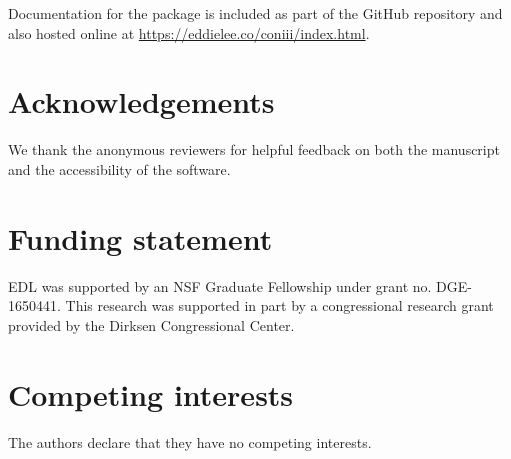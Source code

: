 \documentclass{jors}
\begin{document}
Documentation for the package is included as part of the GitHub repository and also hosted online at \url{https://eddielee.co/coniii/index.html}.

\section*{Acknowledgements}
We thank the anonymous reviewers for helpful feedback on both the manuscript and the accessibility of the software.


\section*{Funding statement}
EDL was supported by an NSF Graduate Fellowship under grant no. DGE-1650441. This research was supported in part by a congressional research grant provided by the Dirksen Congressional Center.


\section*{Competing interests}
The authors declare that they have no competing interests.




\vspace{2cm}
\end{document}
